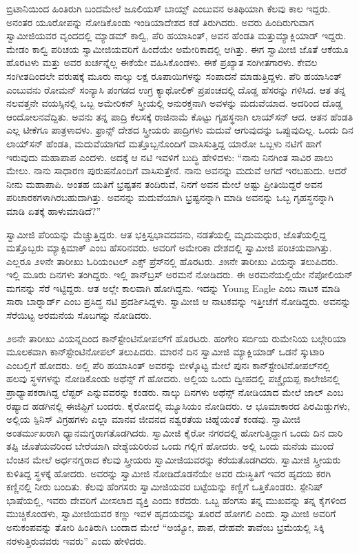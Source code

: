  ಬ್ರಿಟಾನಿಯಿಂದ ಹಿಂತಿರುಗಿ ಬಂದಮೇಲೆ ಜೂಲಿಯಸ್ ಬಾಯ್ಸ್ ಎಂಬುವನ ಅತಿಥಿಯಾಗಿ ಕೆಲವು ಕಾಲ ಇದ್ದರು. ಅನಂತರ ಯೂರೋಪನ್ನು ನೋಡಿಕೊಂಡು ಇಂಡಿಯಾದೇಶದ ಕಡೆ ತಿರುಗಿದರು. ಅವರು ಹಿಂದಿರುಗುವಾಗ ಸ್ವಾಮೀಜಿಯವರ ವೃಂದದಲ್ಲಿ ಮ್ಯಾಡಮ್ ಕಾಲ್ವಿ, ಪೆರಿ ಹಯಾಸಿಂತ್, ಅವನ ಹೆಂಡತಿ ಮತ್ತು\break ಮ್ಯಾಕ್ಲಿಯಾಡ್ ಇದ್ದರು. ಮೇಡಂ ಕಾಲ್ವಿ ಪರಿಚಯ ಸ್ವಾಮೀಜಿಯವರಿಗೆ ಹಿಂದೆಯೇ ಅಮೇರಿಕಾದಲ್ಲಿ ಆಗಿತ್ತು. ಈಗ ಸ್ವಾಮೀಜಿ ಜೊತೆ ಆಕೆಯೂ ಹೊರಟಳು ಮತ್ತು ಅವರ ಖರ್ಚನ್ನೆಲ್ಲ ಈಕೆಯೇ ವಹಿಸಿಕೊಂಡಳು. ಈಕೆ ಪ್ರಖ್ಯಾತ ಸಂಗೀತಗಾರಳು. ಕೇವಲ ಸಂಗೀತದಿಂದಲೇ ವರುಷಕ್ಕೆ ಮೂರು ನಾಲ್ಕು ಲಕ್ಷ ರೂಪಾಯಿಗಳನ್ನು ಸಂಪಾದನೆ ಮಾಡುತ್ತಿದ್ದಳು. ಪೆರಿ ಹಯಾಸಿಂತ್ ಎಂಬುವನು ರೋಮನ್ ಸಂನ್ಯಾಸಿ ಪಂಗಡದ ಉಗ್ರ ಕ್ಯಾಥೋಲಿಕ್ ಪ್ರಪಂಚದಲ್ಲಿ ದೊಡ್ಡ ಹೆಸರನ್ನು ಗಳಿಸಿದ. ಆತ ತನ್ನ ನಲವತ್ತನೇ ವಯಸ್ಸಿನಲ್ಲಿ ಒಬ್ಬ ಅಮೇರಿಕನ್ ಸ್ತ್ರೀಯಲ್ಲಿ ಅನುರಕ್ತನಾಗಿ ಅವಳನ್ನು ಮದುವೆಯಾದ. ಅದರಿಂದ ದೊಡ್ಡ ಆಂದೋಲನವೆದ್ದಿತು. ಅವನು ತನ್ನ ಪಾದ್ರಿ ಕೆಲಸಕ್ಕೆ ರಾಜಿನಾಮೆ ಕೊಟ್ಟು ಗೃಹಸ್ಥನಾಗಿ ಲಾಯ್​ಸನ್ ಆದ. ಆತನ ಹೆಂಡತಿ ಎಲ್ಲ ಟೀಕೆಗೂ ಪಾತ್ರಳಾದಳು. ಫ್ರಾನ್ಸ್ ದೇಶದ ಸ್ತ್ರೀಯರು ಪಾದ್ರಿಗಳು ಮದುವೆ ಆಗುವುದನ್ನು ಒಪ್ಪುವುದಿಲ್ಲ. ಒಂದು ದಿನ ಲಾಯ್​ಸನ್ ಹೆಂಡತಿ, ಮದುವೆಯಾಗದೆ ಮತ್ತೊಬ್ಬನೊಂದಿಗೆ ವಾಸಿಸುತ್ತಿದ್ದ ಯಾರೋ ಒಬ್ಬಳು ನಟಿಗೆ ಹಾಗೆ ಇರುವುದು ಮಹಾಪಾಪ ಎಂದಳು. ಅದಕ್ಕೆ ಆ ನಟಿ ಇವಳಿಗೆ ಬುದ್ಧಿ ಹೇಳಿದಳು: “ನಾನು ನಿನಗಿಂತ ಸಾವಿರ ಪಾಲು ಮೇಲು. ನಾನು ಸಾಧಾರಣ ಪುರುಷನೊಂದಿಗೆ ವಾಸಿಸುತ್ತೇನೆ. ನಾನು ಅವನನ್ನು ಮದುವೆ ಆಗದೆ ಇರಬಹುದು. ಆದರೆ ನೀನು ಮಹಾಪಾಪಿ. ಅಂತಹ ಯತಿಗೆ ಭ್ರಷ್ಟತನ ತಂದಿರುವೆ, ನಿನಗೆ ಅವನ ಮೇಲೆ ಅಷ್ಟು ಪ್ರೀತಿಯಿದ್ದರೆ ಅವನ ಪರಿಚಾರಕಗಳಾಗಿರಬಹುದಾಗಿತ್ತು. ಅವನನ್ನು ಮದುವೆಯಾಗಿ ಭ್ರಷ್ಟನನ್ನಾಗಿ ಮಾಡಿ ಅವನನ್ನು ಒಬ್ಬ ಗೃಹಸ್ಥನನ್ನಾಗಿ ಮಾಡಿ ಏತಕ್ಕೆ ಹಾಳುಮಾಡಿದೆ?” 

 ಸ್ವಾಮೀಜಿ ಪೆರಿಯನ್ನು ಮೆಚ್ಚುತ್ತಿದ್ದರು. ಆತ ಭಕ್ತಿಸ್ವಭಾವದವನು, ನಡತೆಯಲ್ಲಿ ಮೃದುಮಧುರ, ಜೊತೆಯಲ್ಲಿದ್ದ ಮತ್ತೊಬ್ಬರು ಮ್ಯಾಕ್ಸಿಮಾಕ್ ಎಂಬ ಹೆಸರಿನವರು. ಅವರಿಗೆ ಅಮೇರಿಕಾ ದೇಶದಲ್ಲಿ ಸ್ವಾಮೀಜಿ ಪರಿಚಯವಾಗಿತ್ತು. ಎಲ್ಲರೂ ೨೪ನೇ ತಾರೀಖು ಓರಿಯಂಟಲ್ ಎಕ್ಸ್ ಪ್ರೆಸ್‍ನಲ್ಲಿ ಹೊರಟರು. ೨೫ನೇ ತಾರೀಖು ವಿಯನ್ನಾ ತಲುಪಿದರು. ಇಲ್ಲಿ ಮೂರು ದಿನಗಳು ತಂಗಿದ್ದರು. ಇಲ್ಲಿ ಶಾನ್‍ಬ್ರಸ್ ಅರಮನೆ ನೋಡಿದರು. ಈ ಅರಮನೆಯಲ್ಲಿಯೇ ನೆಪೋಲಿಯನ್ ಮಗನನ್ನು ಸೆರೆ ಇಟ್ಟಿದ್ದರು. ಆತ ಅಲ್ಲೇ ಕಾಲವಾಗಿ ಹೋಗಿದ್ದನು. ಇದನ್ನು Young Eagle ಎಂಬ ನಾಟಕ ಮಾಡಿ ಸಾರಾ ಬಾರ್‍ನಾರ್ಡ್ ಎಂಬ ಪ್ರಸಿದ್ಧ ನಟಿ ಪ್ರದರ್ಶಿಸಿದ್ದಳು. ಸ್ವಾಮೀಜಿ ಆ ನಾಟಕವನ್ನು ಇತ್ತೀಚೆಗೆ ನೋಡಿದ್ದರು. ಅವನನ್ನು ಸೆರೆಯಿಟ್ಟ ಅರಮನೆಯ ಸೊಬಗನ್ನು ನೋಡಿದರು. 

 ೨೮ನೇ ತಾರೀಖು ವಿಯನ್ನದಿಂದ ಕಾನ್‍ಸ್ಟೇಂಟಿನೋಪಲ್‍ಗೆ ಹೊರಟರು. ಹಂಗೇರಿ ಸರ್ಬಿಯ ರುಮೇನಿಯ ಬಲ್ಗೇರಿಯಾ ಮೂಲಕವಾಗಿ ಕಾನ್‍ಸ್ಟೇಂಟಿನೋಪಲ್‍ ತಲುಪಿದರು. ಮಾರನೆ ದಿನ ಸ್ವಾಮೀಜಿ ಮ್ಯಾಕ್ಲಿಯಾಡ್ ಒಡನೆ ಸ್ಕುಟಾರಿ ಎಂಬಲ್ಲಿಗೆ ಹೋದರು. ಅಲ್ಲಿ ಪೆರಿ ಹಯಾಸಿಂತ್ ಅವರನ್ನು ಬೀಳ್ಕೊಟ್ಟ ಮೇಲೆ ಪುನಃ ಕಾನ್‍ಸ್ಟೇಂಟಿನೋಪಲ್‍ನಲ್ಲಿ ಹಲವು ಸ್ಥಳಗಳನ್ನು ನೋಡಿಕೊಂಡು ಅಥೆನ್ಸ್ ಗೆ ಹೋದರು. ಅಲ್ಲಿಯ ಒಂದು ದ್ವೀಪದಲ್ಲಿ ಪಚ್ಚೈಯಪ್ಪ ಕಾಲೇಜಿನಲ್ಲಿ ಪ್ರಾಧ್ಯಾಪಕರಾಗಿದ್ದ ಲೆಪ್ಟರ್ ಎನ್ನುವವರನ್ನು ಕಂಡರು. ನಾಲ್ಕು ದಿನಗಳು ಅಥೆನ್ಸ್ ನೋಡಿಯಾದ ಮೇಲೆ ಜಾಲ್ ಎಂಬ ರಷ್ಯಾದ ಹಡಗಿನಲ್ಲಿ ಈಜಿಪ್ಟಿಗೆ ಬಂದರು. ಕೈರೋದಲ್ಲಿ ಮ್ಯೂಸಿಯಂ ನೋಡಿದರು. ಆ ಭೂಮಾಕಾರದ ಪಿರಮಿಡ್ಡುಗಳು, ಅಲ್ಲಿಯ ಸ್ಪಿನಿಸ್ ವಿಗ್ರಹಗಳು ಎಲ್ಲಾ ಮಾನವ ಜೀವನದ ನಶ್ವರತೆಯ ಚಿಹ್ನೆಯಂತೆ ಕಂಡವು. ಸ್ವಾಮೀಜಿ ಅಂತರ್ಮುಖರಾಗಿ ಧ್ಯಾನಮಗ್ನರಾಗತೊಡಗಿದರು. ಸ್ವಾಮೀಜಿ ಕೈರೋ ನಗರದಲ್ಲಿ ಹೋಗುತ್ತಿದ್ದಾಗ ಒಂದು ದಿನ ದಾರಿ ತಪ್ಪಿ ಜೊತೆಯವರಿಂದ ಬೇರೆಯಾಗಿ ವೇಶ್ಯೆಯರಿರುವ ಒಂದು ಗಲ್ಲಿಗೆ ಹೋದರು. ಅಲ್ಲಿ ಒಂದು ಮನೆಯ ಮುಂದೆ ಬೆಂಚಿನ ಮೇಲೆ ಅರ್ಧನಗ್ನರಾದ ಕೆಲವು ಸ್ತ್ರೀಯರು ಸ್ವಾಮೀಜಿಯವರನ್ನು ಕರೆಯತೊಡಗಿದರು. ಸ್ವಾಮೀಜಿ ಸ್ತ್ರೀಯರು ಕುಳಿತಿದ್ದ ಸ್ಥಳಕ್ಕೆ ಹೋದರು. ಅವರನ್ನು ಸ್ವಾಮೀಜಿ ನೋಡಿದೊಡನೆಯೇ ಅವರ ದುಃಸ್ಥಿತಿಗೆ ಇವರ ಹೃದಯ ಕರಗಿ ಕಣ್ಣಿನಲ್ಲಿ ನೀರು ಬಂದಿತು. ಕೆಲವು ಹೆಂಗಸರು ಸ್ವಾಮೀಜಿಯವರ ಬಟ್ಟೆಯನ್ನು ಕಣ್ಣಿಗೆ ಒತ್ತಿಕೊಂಡರು. ಸ್ಪೇನಿಷ್ ಭಾಷೆಯಲ್ಲಿ, ಇವರು ದೇವರಿಗೆ ಮೀಸಲಾದ ವ್ಯಕ್ತಿ ಎಂದು ಕರೆದರು. ಒಬ್ಬ ಹೆಂಗಸು ತನ್ನ ಮುಖವನ್ನು ತನ್ನ ಕೈಗಳಿಂದ ಮುಚ್ಚಿಕೊಂಡಳು, ಸ್ವಾಮೀಜಿಯವರ ಕಣ್ಣು ಇವಳ ಹೃದಯವನ್ನು ತೂರದೆ ಹೋಗಲಿ ಎಂದು. ಸ್ವಾಮೀಜಿ ಅವರಿಗೆ ಅನುಕಂಪವನ್ನು ತೋರಿ ಹಿಂತಿರುಗಿ ಬಂದಾದ ಮೇಲೆ “ಅಯ್ಯೋ, ಪಾಪ, ದೇಹವೇ ತಾವೆಂಬ ಭ್ರಮೆಯಲ್ಲಿ ಸಿಕ್ಕಿ ನರಳುತ್ತಿರುವವರು ಇವರು” ಎಂದು ಹೇಳಿದರು. 

